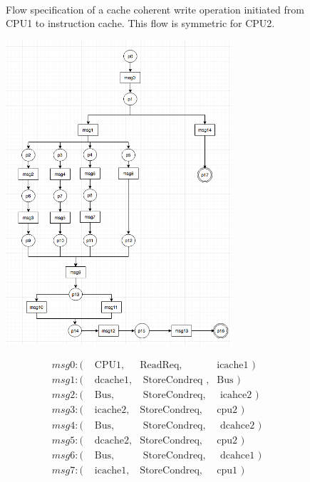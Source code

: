 \documentclass[12pt,frontmatter,copyright,thesis]{usfmanus}
\begin{document}
\begin{appendix}
\begin{figure}[h]
\begin{minipage}{.5\textwidth}
{\[\begin{array}{llll}
 \end{array}
 \]}
\end{minipage}
 \caption{\footnotesize Flow specification of a cache coherent write operation initiated from CPU1 to instruction cache. \footnotesize This flow is symmetric for CPU2. }
 \label{write-flow}
 \end{figure}
 \begin{figure}
 \centering
  \includegraphics[width=3.3in]{figures/Fih6.png}
  \begin{minipage}{.5\textwidth}
 {\footnotesize
 \[
 \begin{array}{llll}
 msg0: (&\mbox{ CPU1},&\mbox{ReadReq},&\mbox{icache1  })\\                   
 msg1: (&\mbox{ dcache1},&\mbox{ StoreCondreq },&\mbox{Bus })\\           
 msg2: (&\mbox{ Bus},&\mbox{ StoreCondreq},&\mbox{ icahce2 })\\
 msg3: (&\mbox{ icache2},&\mbox{StoreCondreq},&\mbox{cpu2       })\\      
 msg4: (&\mbox{ Bus},&\mbox{ StoreCondreq},&\mbox{ dcahce2           })\\ 
 msg5: (&\mbox{ dcache2},&\mbox{StoreCondreq},&\mbox{cpu2 })\\
 msg6: (&\mbox{ Bus},&\mbox{ StoreCondreq},&\mbox{ dcahce1     })\\       
 msg7: (&\mbox{ icache1},&\mbox{StoreCondreq},&\mbox{cpu1           })
  \end{array}
 \]}
 \end{minipage}%

\end{figure}
\end{appendix}
\end{document}

